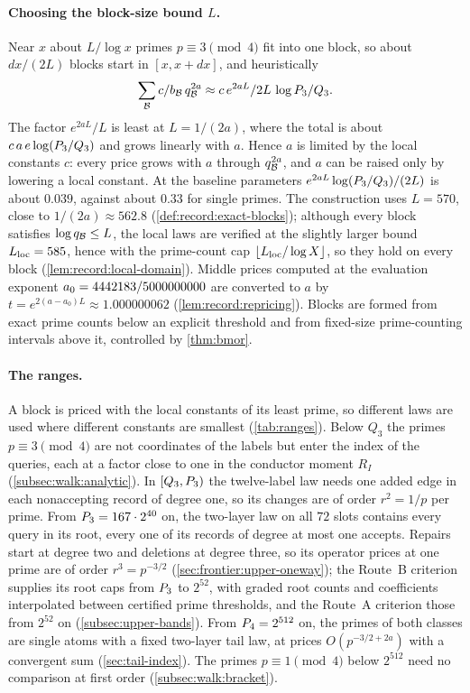 \paragraph{Choosing the block-size bound $L$.}
Near $x$ about $L/\log x$ primes $p\equiv3\pmod4$ fit into one block, so about
$dx/(2L)$ blocks start in $[x,x+dx]$, and heuristically
\[
 \sum_{\mathcal B}c/b_\mathcal B\,q_\mathcal B^{2a}\approx
 c\,e^{2aL}/2L\,\log P_3/Q_3.
\]
The factor $e^{2aL}/L$ is least at $L=1/(2a)$, where the total is
about $c\,a\,e\log(P_3/Q_3)$ and grows linearly with $a$. Hence
$a$ is limited by the local constants $c$: every price grows with $a$
through $q_\mathcal B^{2a}$, and $a$ can be raised only by lowering a local
constant. At the baseline parameters $e^{2aL}\log(P_3/Q_3)/(2L)$
is about $0.039$, against about $0.33$ for single primes. The
construction uses $L=570$, close to $1/(2a)\approx562.8$
(\cref{def:record:exact-blocks}); although every block satisfies $\log q_\mathcal B\le L$,
the local laws are verified at the slightly larger bound
$L_{\rm loc}=585$, hence with the prime-count cap
$\lfloor L_{\rm loc}/\log X\rfloor$, so they hold on every block
(\cref{lem:record:local-domain}). Middle prices computed at the
evaluation exponent $a_0=4442183/5000000000$ are converted to $a$ by
$t=e^{2(a-a_0)L}\approx1.000000062$ (\cref{lem:record:repricing}).
Blocks are formed from exact prime counts below an explicit
threshold and from fixed-size prime-counting intervals above it,
controlled by \cref{thm:bmor}.

\paragraph{The ranges.}
A block is priced with the local constants of its least prime, so different
laws are used where different constants are smallest (\cref{tab:ranges}).
Below $Q_3$ the primes $p\equiv3\pmod4$ are not coordinates of the labels but
enter the index of the queries, each at a factor close to one in the conductor
moment $R_I$ (\cref{subsec:walk:analytic}). In $[Q_3,P_3)$ the twelve-label
law needs one added edge in each nonaccepting record of degree one, so its
changes are of order $r^2=1/p$ per prime. From $P_3=167\cdot2^{40}$ on, the
two-layer law on all $72$ slots contains every query in its root, every one of
its records of degree at most one accepts. Repairs start at degree two
and deletions at degree three, so its operator prices at one prime
are of order $r^3=p^{-3/2}$
(\cref{sec:frontier:upper-oneway}); the Route~B criterion supplies
its root caps from $P_3$ to $2^{52}$, with graded root counts and
coefficients interpolated between certified prime thresholds, and
the Route~A criterion those from $2^{52}$ on
(\cref{subsec:upper-bands}). From
$P_4=2^{512}$ on, the primes of both classes are single atoms with a fixed
two-layer tail law, at prices $O(p^{-3/2+2a})$ with a convergent sum
(\cref{sec:tail-index}). The primes $p\equiv1\pmod4$ below $2^{512}$ need no
comparison at first order (\cref{subsec:walk:bracket}).

